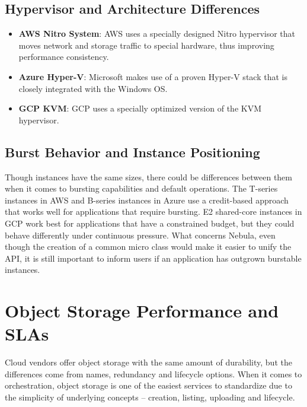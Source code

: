 \subsection{Hypervisor and Architecture Differences}
\begin{itemize}
    \item \textbf{AWS Nitro System}: AWS uses a specially designed Nitro hypervisor that moves network and storage traffic to special hardware, thus improving performance consistency.
    \item \textbf{Azure Hyper-V}: Microsoft makes use of a proven Hyper-V stack that is closely integrated with the Windows OS.
    \item \textbf{GCP KVM}:  GCP uses a specially optimized version of the KVM hypervisor.
\end{itemize}

\subsection{Burst Behavior and Instance Positioning}
Though instances have the same sizes, there could be differences between them when it comes to bursting capabilities and default operations. The T-series instances in AWS and B-series instances in Azure use a credit-based approach that works well for applications that require bursting. E2 shared-core instances in GCP work best for applications that have a constrained budget, but they could behave differently under continuous pressure. What concerns Nebula, even though the creation of a common micro class would make it easier to unify the API, it is still important to inform users if an application has outgrown burstable instances.


\section{Object Storage Performance and SLAs}
Cloud vendors offer object storage with the same amount of durability, but the differences come from names, redundancy and lifecycle options. When it comes to orchestration, object storage is one of the easiest services to standardize due to the simplicity of underlying concepts – creation, listing, uploading and lifecycle.

